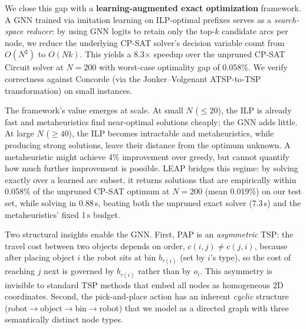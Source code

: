 \documentclass[review,times]{elsarticle}
\begin{document}
We close this gap with a \textbf{learning-augmented exact optimization} framework. A GNN trained via imitation learning on ILP-optimal prefixes serves as a \emph{search-space reducer}: by using GNN logits to retain only the top-$k$ candidate arcs per node, we reduce the underlying CP-SAT solver's decision variable count from $O(N^2)$ to $O(Nk)$. This yields a 8.3$\times$ speedup over the unpruned CP-SAT Circuit solver at $N{=}200$ with worst-case optimality gap of 0.058\%. We verify correctness against Concorde \cite{applegate2006concorde} (via the Jonker--Volgenant ATSP-to-TSP transformation) on small instances.

The framework's value emerges at scale. At small $N$ (${\le}20$), the ILP is already fast and metaheuristics find near-optimal solutions cheaply; the GNN adds little. At large $N$ (${\ge}40$), the ILP becomes intractable and metaheuristics, while producing strong solutions, leave their distance from the optimum unknown. A metaheuristic might achieve 4\% improvement over greedy, but cannot quantify how much further improvement is possible. LEAP bridges this regime: by solving exactly over a learned arc subset, it returns solutions that are empirically within 0.058\% of the unpruned CP-SAT optimum at $N{=}200$ (mean 0.019\%) on our test set, while solving in 0.88\,s, beating both the unpruned exact solver (7.3\,s) and the metaheuristics' fixed 1\,s budget.

Two structural insights enable the GNN. First, PAP is an \emph{asymmetric} TSP: the travel cost between two objects depends on order, $c(i,j)\neq c(j,i)$, because after placing object $i$ the robot sits at bin $b_{\tau(i)}$ (set by $i$'s type), so the cost of reaching $j$ next is governed by $b_{\tau(i)}$ rather than by $o_i$. This asymmetry is invisible to standard TSP methods that embed all nodes as homogeneous 2D coordinates. Second, the pick-and-place action has an inherent \emph{cyclic} structure (robot$\to$object$\to$bin$\to$robot) that we model as a directed graph with three semantically distinct node types.
\end{document}
